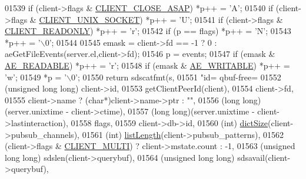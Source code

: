 \begin{DoxyCode}
{{{{{{{{{{{{{{{{{{01539     \textcolor{keywordflow}{if} (client->flags & \hyperlink{server_8h_ad6690c6231b67525b8b2057e092a8361}{CLIENT\_CLOSE\_ASAP}) *p++ = \textcolor{stringliteral}{'A'};
01540     \textcolor{keywordflow}{if} (client->flags & \hyperlink{server_8h_ae19f45757ef3ffb2f3abb86cbc3b67a2}{CLIENT\_UNIX\_SOCKET}) *p++ = \textcolor{stringliteral}{'U'};
01541     \textcolor{keywordflow}{if} (client->flags & \hyperlink{server_8h_a84ba0494755e2f4f0faf6017175b5e0a}{CLIENT\_READONLY}) *p++ = \textcolor{stringliteral}{'r'};
01542     \textcolor{keywordflow}{if} (p == flags) *p++ = \textcolor{stringliteral}{'N'};
01543     *p++ = \textcolor{stringliteral}{'\(\backslash\)0'};
01544 
01545     emask = client->fd == -1 ? 0 : aeGetFileEvents(server.el,client->fd);
01546     p = events;
01547     \textcolor{keywordflow}{if} (emask & \hyperlink{ae_8h_a7a9a2162d007d09739955b4e55c65bf3}{AE\_READABLE}) *p++ = \textcolor{stringliteral}{'r'};
01548     \textcolor{keywordflow}{if} (emask & \hyperlink{ae_8h_ab6bfb0366ccb6277112d132c2a2bf500}{AE\_WRITABLE}) *p++ = \textcolor{stringliteral}{'w'};
01549     *p = \textcolor{stringliteral}{'\(\backslash\)0'};
01550     \textcolor{keywordflow}{return} sdscatfmt(s,
01551         \textcolor{stringliteral}{"id=%
       qbuf-free=%
01552         (\textcolor{keywordtype}{unsigned} \textcolor{keywordtype}{long} \textcolor{keywordtype}{long}) client->id,
01553         getClientPeerId(client),
01554         client->fd,
01555         client->name ? (\textcolor{keywordtype}{char}*)client->name->ptr : \textcolor{stringliteral}{""},
01556         (\textcolor{keywordtype}{long} \textcolor{keywordtype}{long})(server.unixtime - client->ctime),
01557         (\textcolor{keywordtype}{long} \textcolor{keywordtype}{long})(server.unixtime - client->lastinteraction),
01558         flags,
01559         client->db->id,
01560         (\textcolor{keywordtype}{int}) \hyperlink{dict_8h_af193430dd3d5579a52b194512f72c1f0}{dictSize}(client->pubsub\_channels),
01561         (\textcolor{keywordtype}{int}) \hyperlink{adlist_8h_afde0ab079f934670e82119b43120e94b}{listLength}(client->pubsub\_patterns),
01562         (client->flags & \hyperlink{server_8h_a7f61f783f429419f8c593291a509b03a}{CLIENT\_MULTI}) ? client->mstate.count : -1,
01563         (\textcolor{keywordtype}{unsigned} \textcolor{keywordtype}{long} \textcolor{keywordtype}{long}) sdslen(client->querybuf),
01564         (\textcolor{keywordtype}{unsigned} \textcolor{keywordtype}{long} \textcolor{keywordtype}{long}) sdsavail(client->querybuf),
}}}}}}}}}}}}}}}}}}}
\end{DoxyCode}

